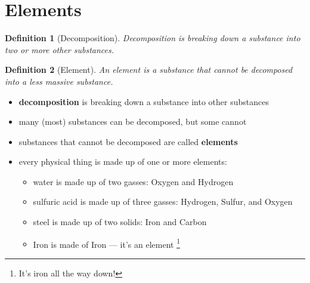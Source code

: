 \documentclass[11pt, oneside]{article}   	%
\newtheorem{definition}{Definition}
\begin{document}
\section{Elements}
\begin{definition}[Decomposition]
Decomposition is breaking down a substance into two or more other substances.
\end{definition}

\begin{definition}[Element]
An element is a substance that cannot be decomposed into a less massive substance.
\end{definition}

\begin{itemize}
\item \textbf{decomposition} is breaking down a substance into other substances
\item many (most) substances can be decomposed, but some cannot
\item substances that cannot be decomposed are called \textbf{elements} \cite[p. 74]{wile-chem-2}
\item every physical thing is made up of one or more elements:
\begin{itemize}
\item water is made up of two gasses: Oxygen and Hydrogen
\item sulfuric acid is made up of three gasses: Hydrogen, Sulfur, and Oxygen
\item steel is made up of two solids: Iron and Carbon
\item Iron is made of Iron --- it's an element \footnote{It's iron all the way down!}
\end{itemize}
\end{itemize}
\end{document}
